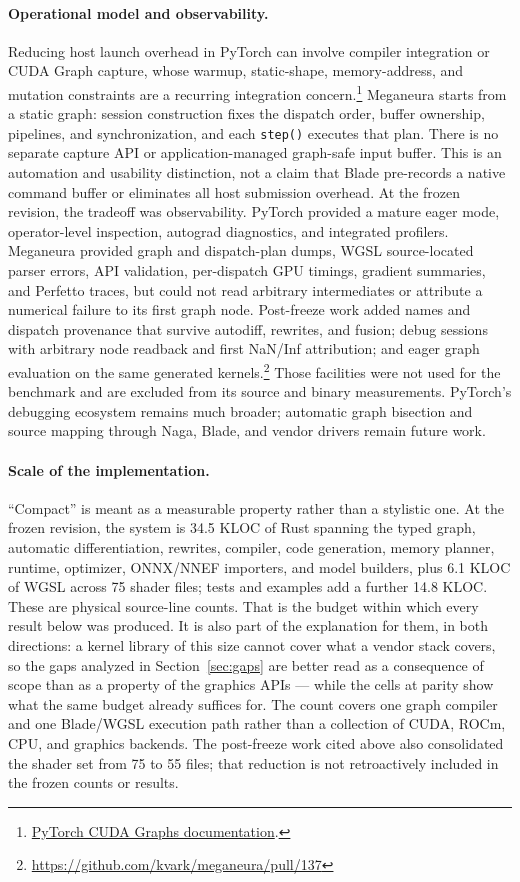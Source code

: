 \documentclass[10pt,twocolumn]{article}
\newcommand{\system}{Meganeura}
\newcommand{\code}[1]{\texttt{#1}}
\begin{document}
\paragraph{Operational model and observability.}
Reducing host launch overhead in PyTorch can involve compiler integration or
CUDA Graph capture, whose warmup, static-shape, memory-address, and mutation
constraints are a recurring integration concern.\footnote{\href{
https://docs.pytorch.org/docs/stable/notes/cuda.html\#cuda-graphs}{
PyTorch CUDA Graphs documentation}.}
\system{} starts from a static graph: session construction fixes the dispatch
order, buffer ownership, pipelines, and synchronization, and each
\code{step()} executes that plan. There is no separate capture API or
application-managed graph-safe input buffer. This is an automation and
usability distinction, not a claim that Blade pre-records a native command
buffer or eliminates all host submission overhead.
At the frozen revision, the tradeoff was observability. PyTorch provided a
mature eager mode, operator-level inspection, autograd diagnostics, and
integrated profilers. \system{} provided graph and dispatch-plan dumps, WGSL
source-located parser errors, API validation, per-dispatch GPU timings,
gradient summaries, and Perfetto traces, but could not read arbitrary
intermediates or attribute a numerical failure to its first graph node.
Post-freeze work added names and dispatch provenance that survive autodiff,
rewrites, and fusion; debug sessions with arbitrary node readback and first
NaN/Inf attribution; and eager graph evaluation on the same generated
kernels.\footnote{\url{https://github.com/kvark/meganeura/pull/137}}
Those facilities were not used for the benchmark and are excluded from its
source and binary measurements. PyTorch's debugging ecosystem remains much
broader; automatic graph bisection and source mapping through Naga, Blade,
and vendor drivers remain future work.

\paragraph{Scale of the implementation.}
``Compact'' is meant as a measurable property rather than a stylistic one.
At the frozen revision, the system is 34.5 KLOC of Rust spanning the typed
graph, automatic differentiation, rewrites, compiler, code generation, memory
planner, runtime, optimizer, ONNX/NNEF importers, and model builders, plus
6.1 KLOC of WGSL across 75 shader files; tests and examples add a further
14.8 KLOC.
These are physical source-line counts. That is the budget within which every
result below was produced. It is also
part of the explanation for them, in both directions: a kernel library of
this size cannot cover what a vendor stack covers, so the gaps analyzed in
Section~\ref{sec:gaps} are better read as a consequence of scope than as a
property of the graphics APIs --- while the cells at parity show what the
same budget already suffices for. The count covers one graph compiler and one
Blade/WGSL execution path rather than a collection of CUDA, ROCm, CPU, and
graphics backends. The post-freeze work cited above also consolidated the
shader set from 75 to 55 files; that reduction is not retroactively included
in the frozen counts or results.
\end{document}
